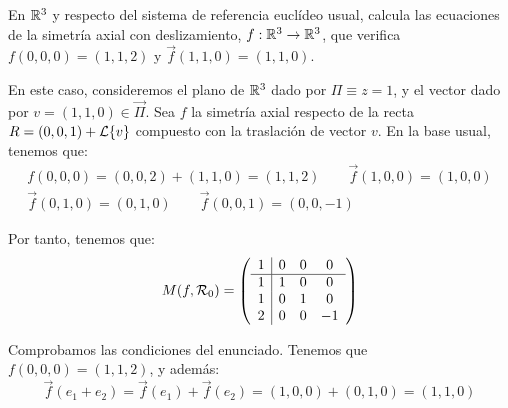 \documentclass[12pt]{article}
\begin{document}
    \begin{ejercicio}[2.5 puntos] En $\mathbb{R}^3$ y respecto del sistema de referencia euclídeo usual, calcula las ecuaciones
        de la simetría axial con deslizamiento, $f:\mathbb{R}^3 \to \mathbb{R}^3$, que verifica $f(0,0,0)=(1,1,2)$ y $\vec{f}(1,1,0)=(1,1,0)$.

        En este caso, consideremos el plano de $\mathbb{R}^3$ dado por $\Pi\equiv z=1$, y el vector dado por $v=(1,1,0)\in \vec{\Pi}$.
        Sea $f$ la simetría axial respecto de la recta $R=(0,0,1) + \mathcal{L}\{v\}$ compuesto con la traslación de vector $v$.
        En la base usual, tenemos que:
        \begin{gather*}
            f(0,0,0)=(0,0,2) + (1,1,0) = (1,1,2) \qquad
            \vec{f}(1,0,0) = (1,0,0) \\
            \vec{f}(0,1,0) = (0,1,0) \qquad
            \vec{f}(0,0,1) = (0,0,-1)
        \end{gather*}

        Por tanto, tenemos que:
        \begin{equation*}
            M(f, \mathcal{R}_0) = \left(
                \begin{array}{c|ccc}
                    1 & 0 & 0 & 0 \\
                    \hline
                    1 & 1 & 0 & 0 \\
                    1 & 0 & 1 & 0 \\
                    2 & 0 & 0 & -1
                \end{array}
            \right)
        \end{equation*}

        Comprobamos las condiciones del enunciado. Tenemos que $f(0,0,0)=(1,1,2)$, y además:
        \begin{equation*}
            \vec{f}(e_1+e_2) = \vec{f}(e_1) + \vec{f}(e_2) = (1,0,0) + (0,1,0) = (1,1,0)
        \end{equation*}
        
    \end{ejercicio}
\end{document}
